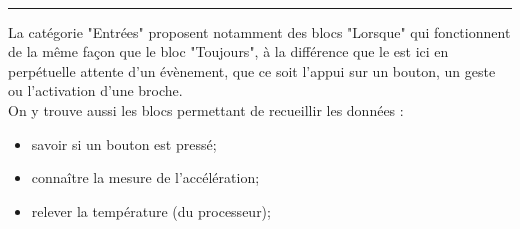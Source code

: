\begin{minipage}[t]{0.75\linewidth}

    \begin{blocEntrees}\\
      \rule{-0.25em}{2em}
La catégorie "Entrées" proposent notamment des blocs "Lorsque" qui fonctionnent de la même façon que le bloc "Toujours", à la différence que le \mb est ici en perpétuelle attente d'un évènement, que ce soit l'appui sur un bouton, un geste ou l'activation d'une broche.\\
\vspace{5mm}
On y trouve aussi les blocs permettant de recueillir les données :
\begin{itemize}
  \item savoir si un bouton est pressé;
  \item connaître la mesure de l'accélération;
  \item relever la température (du processeur);
\end{itemize}

    \end{blocEntrees}

\end{minipage}
\hfill
